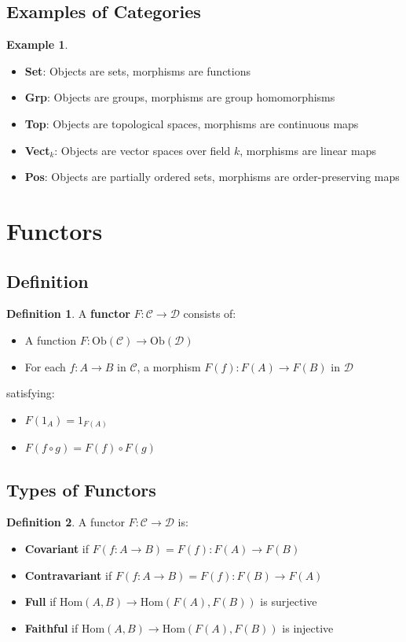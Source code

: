 \documentclass[11pt]{article}
\theoremstyle{definition}
\newtheorem{definition}{Definition}[section]
\newtheorem{example}{Example}[section]
\begin{document}
\subsection{Examples of Categories}
\begin{example}
\begin{itemize}
    \item \textbf{Set}: Objects are sets, morphisms are functions
    \item \textbf{Grp}: Objects are groups, morphisms are group homomorphisms
    \item \textbf{Top}: Objects are topological spaces, morphisms are continuous maps
    \item \textbf{Vect}$_k$: Objects are vector spaces over field $k$, morphisms are linear maps
    \item \textbf{Pos}: Objects are partially ordered sets, morphisms are order-preserving maps
\end{itemize}
\end{example}

\section{Functors}

\subsection{Definition}
\begin{definition}
A \textbf{functor} $F: \mathcal{C} \to \mathcal{D}$ consists of:
\begin{itemize}
    \item A function $F: \text{Ob}(\mathcal{C}) \to \text{Ob}(\mathcal{D})$
    \item For each $f: A \to B$ in $\mathcal{C}$, a morphism $F(f): F(A) \to F(B)$ in $\mathcal{D}$
\end{itemize}
satisfying:
\begin{itemize}
    \item $F(1_A) = 1_{F(A)}$
    \item $F(f \circ g) = F(f) \circ F(g)$
\end{itemize}
\end{definition}

\subsection{Types of Functors}
\begin{definition}
A functor $F: \mathcal{C} \to \mathcal{D}$ is:
\begin{itemize}
    \item \textbf{Covariant} if $F(f: A \to B) = F(f): F(A) \to F(B)$
    \item \textbf{Contravariant} if $F(f: A \to B) = F(f): F(B) \to F(A)$
    \item \textbf{Full} if $\text{Hom}(A,B) \to \text{Hom}(F(A),F(B))$ is surjective
    \item \textbf{Faithful} if $\text{Hom}(A,B) \to \text{Hom}(F(A),F(B))$ is injective
\end{itemize}
\end{definition}
\end{document}
